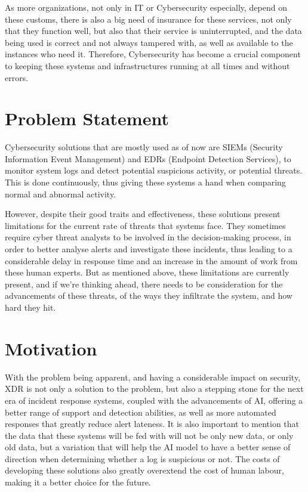 \documentclass[12pt,a4paper]{report}
\begin{document}
As more organizations, not only in IT or Cybersecurity especially, depend on these customs,
there is also a big need of insurance for these services, not only that they function well, but
also that their service is uninterrupted, and the data being used is correct and not always
tampered with, as well as available to the instances who need it. Therefore, Cybersecurity has
become a crucial component to keeping these systems and infrastructures running at all times and
without errors.

\section{Problem Statement}

Cybersecurity solutions that are mostly used as of now are SIEMs (Security Information Event
Management) and EDRs (Endpoint Detection Services), to monitor system logs and detect potential
suspicious activity, or potential threats. This is done continuously, thus giving these systems a
hand when comparing normal and abnormal activity.

However, despite their good traits and effectiveness, these solutions present limitations for the
current rate of threats that systems face. They sometimes require cyber threat analysts to be
involved in the decision-making process, in order to better analyse alerts and investigate these
incidents, thus leading to a considerable delay in response time and an increase in the amount of
work from these human experts. But as mentioned above, these limitations are currently present,
and if we're thinking ahead, there needs to be consideration for the advancements of these
threats, of the ways they infiltrate the system, and how hard they hit.

\section{Motivation}

With the problem being apparent, and having a considerable impact on security, XDR is not only a
solution to the problem, but also a stepping stone for the next era of incident response systems,
coupled with the advancements of AI, offering a better range of support and detection abilities,
as well as more automated responses that greatly reduce alert lateness. It is also important to
mention that the data that these systems will be fed with will not be only new data, or only old
data, but a variation that will help the AI model to have a better sense of direction when
determining whether a log is suspicious or not. The costs of developing these solutions also
greatly overextend the cost of human labour, making it a better choice for the future.
\end{document}

